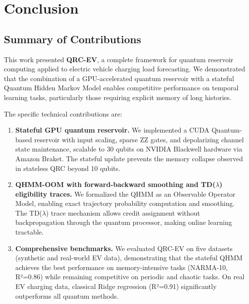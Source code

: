 
\chapter{Conclusion}
\label{chap:conclusion}


\section{Summary of Contributions}


This work presented \textbf{QRC-EV}, a complete framework for quantum
reservoir computing applied to electric vehicle charging load forecasting.
We demonstrated that the combination of a GPU-accelerated quantum reservoir
with a stateful Quantum Hidden Markov Model enables competitive performance
on temporal learning tasks, particularly those requiring explicit memory
of long histories.


The specific technical contributions are:

\begin{enumerate}
  \item \textbf{Stateful GPU quantum reservoir.} We implemented a
    CUDA Quantum-based reservoir with input scaling, sparse ZZ gates,
    and depolarizing channel state maintenance, scalable to 30 qubits
    on NVIDIA Blackwell hardware via Amazon Braket. The stateful update
    prevents the memory collapse observed in stateless QRC beyond
    10 qubits.


  \item \textbf{QHMM-OOM with forward-backward smoothing and TD($\lambda$)
    eligibility traces.} We formalized the QHMM as an Observable Operator Model,
    enabling exact trajectory probability computation and smoothing. The
    TD($\lambda$) trace mechanism allows credit assignment without
    backpropagation through the quantum processor, making online learning
    tractable.


  \item \textbf{Comprehensive benchmarks.} We evaluated QRC-EV on five
    datasets (synthetic and real-world EV data), demonstrating that the
    stateful QHMM achieves the best performance on memory-intensive tasks
    (NARMA-10, R²=0.86) while remaining competitive on periodic and
    chaotic tasks. On real EV charging data, classical Ridge regression
    (R²=0.91) significantly outperforms all quantum methods.

\end{enumerate}

